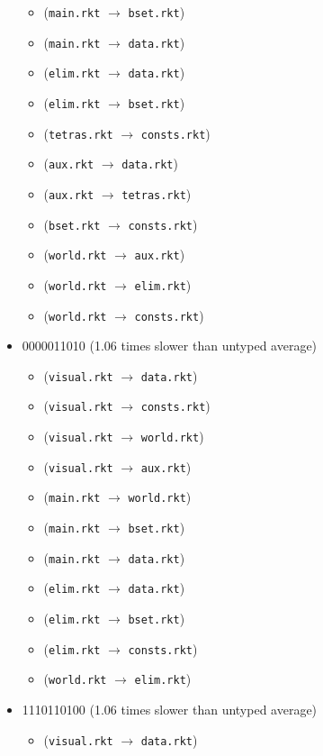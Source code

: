 \documentclass{article}
\newcommand{\mono}[1]{\texttt{#1}}
\begin{document}
\begin{itemize}
\begin{itemize}
  \item (\mono{main.rkt} $\rightarrow$ \mono{bset.rkt})
  \item (\mono{main.rkt} $\rightarrow$ \mono{data.rkt})
  \item (\mono{elim.rkt} $\rightarrow$ \mono{data.rkt})
  \item (\mono{elim.rkt} $\rightarrow$ \mono{bset.rkt})
  \item (\mono{tetras.rkt} $\rightarrow$ \mono{consts.rkt})
  \item (\mono{aux.rkt} $\rightarrow$ \mono{data.rkt})
  \item (\mono{aux.rkt} $\rightarrow$ \mono{tetras.rkt})
  \item (\mono{bset.rkt} $\rightarrow$ \mono{consts.rkt})
  \item (\mono{world.rkt} $\rightarrow$ \mono{aux.rkt})
  \item (\mono{world.rkt} $\rightarrow$ \mono{elim.rkt})
  \item (\mono{world.rkt} $\rightarrow$ \mono{consts.rkt})
  \end{itemize}
\item 0000011010 (1.06 times slower than untyped average)
  \begin{itemize}
  \item (\mono{visual.rkt} $\rightarrow$ \mono{data.rkt})
  \item (\mono{visual.rkt} $\rightarrow$ \mono{consts.rkt})
  \item (\mono{visual.rkt} $\rightarrow$ \mono{world.rkt})
  \item (\mono{visual.rkt} $\rightarrow$ \mono{aux.rkt})
  \item (\mono{main.rkt} $\rightarrow$ \mono{world.rkt})
  \item (\mono{main.rkt} $\rightarrow$ \mono{bset.rkt})
  \item (\mono{main.rkt} $\rightarrow$ \mono{data.rkt})
  \item (\mono{elim.rkt} $\rightarrow$ \mono{data.rkt})
  \item (\mono{elim.rkt} $\rightarrow$ \mono{bset.rkt})
  \item (\mono{elim.rkt} $\rightarrow$ \mono{consts.rkt})
  \item (\mono{world.rkt} $\rightarrow$ \mono{elim.rkt})
  \end{itemize}
\item 1110110100 (1.06 times slower than untyped average)
  \begin{itemize}
  \item (\mono{visual.rkt} $\rightarrow$ \mono{data.rkt})

\end{itemize}
\end{itemize}
\end{document}
